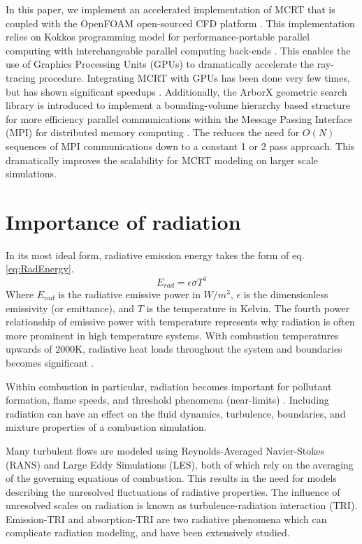 In this paper, we implement an accelerated implementation of MCRT that is coupled with the OpenFOAM open-sourced CFD platform \cite{Weller1998ATechniques}. 
This implementation relies on Kokkos programming model for performance-portable parallel computing with interchangeable parallel computing back-ends \cite{Trott2021KokkosEra}. This enables the use of Graphics Processing Units (GPUs) to dramatically accelerate the ray-tracing procedure. Integrating MCRT with GPUs has been done very few times, but has shown significant speedups \cite{Silvestri2019ASimulation,Humphrey2016RadiativeRefinement,Heymann2012GPU-basedAGN}. 
Additionally, the ArborX geometric search library is introduced to implement a bounding-volume hierarchy based structure for more efficiency parallel communications within the Message Passing Interface (MPI) for distributed memory computing \cite{Lebrun-Grandie2019ArborX:Library}. 
The  reduces the need for $O(N)$ sequences of MPI communications down to a constant 1 or 2 pass approach. This dramatically improves the scalability for MCRT modeling on larger scale simulations. 

\section{Importance of radiation}
In its most ideal form, radiative emission energy takes the form of eq. \ref{eq:RadEnergy}.
\begin{equation}
    E_{rad}=\epsilon{}\sigma{}T^4
    \label{eq:RadEnergy}
\end{equation}
Where $E_{rad}$ is the radiative emissive power in $W/m^3$, $\epsilon{}$ is the dimensionless emissivity (or emittance), and $T$ is the temperature in Kelvin. 
The fourth power relationship of emissive power with temperature represents why radiation is often more prominent in high temperature systems. With combustion temperatures upwards of 2000K, radiative heat loads throughout the system and boundaries becomes significant \cite{Modest2016RadiativeSystems}.

Within combustion in particular, radiation becomes important for pollutant formation, flame speeds, and threshold phenomena (near-limits) \cite{Modest2016RadiativeSystems,Coelho2018RadiativeSystems,Liu2020TheFlames}. Including radiation can have an effect on the fluid dynamics, turbulence, boundaries, and mixture properties of a combustion simulation.

Many turbulent flows are modeled using Reynolds-Averaged Navier-Stokes (RANS) and Large Eddy Simulations (LES), both of which rely on the averaging of the governing equations of combustion. This results in the need for models describing the unresolved fluctuations of radiative properties. The influence of unresolved scales on radiation is known as turbulence-radiation interaction (TRI). Emission-TRI and absorption-TRI are two radiative phenomena which can complicate radiation modeling, and have been extensively studied.

